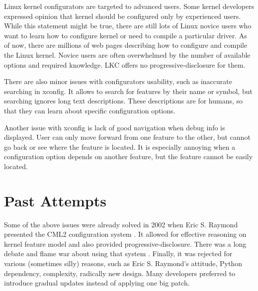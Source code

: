 \documentclass{chi2009}
\begin{document}
Linux kernel configurators are targeted to advanced users. Some kernel developers expressed opinion \cite{ADDREF} that kernel should be configured only by experienced users. While this statement might be true, there are still lots of Linux novice users who want to learn how to configure kernel or need to compile a particular driver. As of now, there are millions of web pages describing how to configure and compile the Linux kernel. Novice users are often overwhelmed by the number of available options and required knowledge. LKC offers no progressive-disclosure for them.

There are also minor issues with configurators usability, such as inaccurate searching in xconfig. It allows to search for features by their name or symbol, but searching ignores long text descriptions. These descriptions are for humans, so that they can learn about specific configuration options.

Another issue with xconfig is lack of good navigation when debug info is displayed. User can only move forward from one feature to the other, but cannot go back or see where the feature is located. It is especially annoying when a configuration option depends on another feature, but the feature cannot be easily located.

\section{Past Attempts}
Some of the above issues were already solved in 2002 when Eric S. Raymond presented the CML2 configuration system \cite{raymond:cml2:2000}. It allowed for effective reasoning on kernel feature model and also provided progressive-disclosure. There was a long debate and flame war about using that system \cite{kerneltrap:linux:2002}. Finally, it was rejected for various (sometimes silly) reasons, such as Eric S. Raymond's attitude, Python dependency, complexity, radically new design. Many developers preferred to introduce gradual updates instead of applying one big patch.
\end{document}
